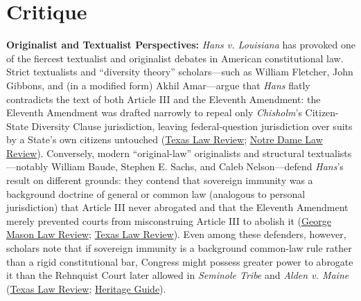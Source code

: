\documentclass[12pt]{article}
\begin{document}
\section{Critique}
\textbf{Originalist and Textualist Perspectives:} \textit{Hans v. Louisiana} has provoked one of the fiercest textualist and originalist debates in American constitutional law. Strict textualists and ``diversity theory'' scholars---such as William Fletcher, John Gibbons, and (in a modified form) Akhil Amar---argue that \textit{Hans} flatly contradicts the text of both Article III and the Eleventh Amendment: the Eleventh Amendment was drafted narrowly to repeal only \textit{Chisholm}'s Citizen-State Diversity Clause jurisdiction, leaving federal-question jurisdiction over suits by a State's own citizens untouched (\href{https://texaslawreview.org/state-sovereign-immunity-after-the-revolution/}{Texas Law Review}; \href{https://ndlawreview.org/wp-content/uploads/2013/07/Menashi.pdf}{Notre Dame Law Review}). Conversely, modern ``original-law'' originalists and structural textualists---notably William Baude, Stephen E. Sachs, and Caleb Nelson---defend \textit{Hans}'s result on different grounds: they contend that sovereign immunity was a background doctrine of general or common law (analogous to personal jurisdiction) that Article III never abrogated and that the Eleventh Amendment merely prevented courts from misconstruing Article III to abolish it (\href{https://lawreview.gmu.edu/print__issues/sovereign-immunity-and-the-two-tiers-of-article-iii/}{George Mason Law Review}; \href{https://texaslawreview.org/state-sovereign-immunity-after-the-revolution/}{Texas Law Review}). Even among these defenders, however, scholars note that if sovereign immunity is a background common-law rule rather than a rigid constitutional bar, Congress might possess greater power to abrogate it than the Rehnquist Court later allowed in \textit{Seminole Tribe} and \textit{Alden v. Maine} (\href{https://texaslawreview.org/state-sovereign-immunity-after-the-revolution/}{Texas Law Review}; \href{https://constitution.heritage.org/essays/amdt-11/}{Heritage Guide}).
\end{document}
